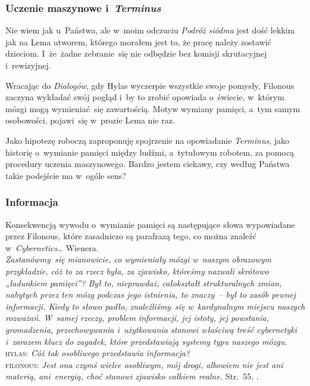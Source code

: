 \documentclass[10pt,t]{beamer}
\begin{document}
\begin{frame}
  \frametitle{Uczenie maszynowe i~\textit{Terminus}}


  Nie wiem jak u~Państwa, ale w~moim odczuciu \textit{Podróż siódma} jest
  dość lekkim jak na Lema utworem, którego morałem jest to, że pracę należy
  zostawić dzieciom. I~że~żadne zebranie~się nie odbędzie bez komisji
  skrutacyjnej i~rewizyjnej.

  Wracając do \textit{Dialogów}, gdy Hylas wyczerpie wszystkie swoje
  pomysły, Filonous zaczyna wykładać swój pogląd i~by to zrobić
  opowiada o~świecie, w~którym mózgi mogą wymieniać~się zawartością. Motyw
  wymiany pamięci, a~tym samym osobowości, pojawi~się w~prozie Lema nie raz.

  Jako hipotezę roboczą zaproponuję spojrzenie na opowiadanie
  \textit{Terminus}, jako historię o~wymianie pamięci między ludźmi,
  a~tytułowym robotem, za pomocą procedury uczenia maszynowego. Bardzo
  jestem ciekawy, czy według Państwa takie podejście ma w~ogóle sens?

\end{frame}





\begin{frame}
  \frametitle{Informacja}


  Konsekwencją wywodu o~wymianie pamięci są następujące słowa wypowiadane
  przez Filonous, które zasadniczo są parafrazą tego, co można znaleźć
  w~\textit{Cybernetics\ldots} Wienera. \\
  \textit{Zastanówmy~się mianowicie, co wymieniały mózgi w~naszym obrazowym
    przykładzie, cóż to za rzecz była, za zjawisko, któreśmy nazwali
    skrótowo „ładunkiem pamięci”? Był to, nieprawdaż, całokształt
    strukturalnych zmian, nabytych przez ten mózg podczas jego istnienia,
    to znaczy~-- był to zasób pewnej informacji. Kiedy to słowo padło,
    znaleźliśmy~się w~kardynalnym miejscu naszych rozważań. W~samej rzeczy,
    problem informacji, jej istoty, jej powstania, gromadzenia,
    przechowywania i~użytkowania stanowi właściwą treść cybernetyki
    i~zarazem klucz do zagadek, które przedstawiają systemy typu naszego
    mózgu.} \\
  \textsc{hylas}: \textit{Cóż tak osobliwego przedstawia informacja?} \\
  \textsc{filonous}: \textit{Jest ona czymś wielce osobliwym, mój drogi,
    albowiem nie jest ani materią, ani~energią, choć stanowi zjawisko
    całkiem realne.} Str.~$55$, \parencite{Lem-Dialogi-Vol-I-Pub-1996}.

\end{frame}
\end{document}
